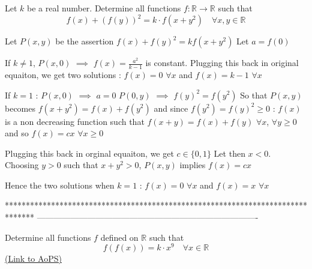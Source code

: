 \begin{solution}
	\begin{tcolorbox}Let $k$ be a real number. Determine all functions $f:\mathbb R\to\mathbb R$ such that 
\[f(x)+(f(y))^2=k\cdot f(x+y^2) \quad \forall x,y\in\mathbb R\]\end{tcolorbox}
Let $P(x,y)$ be the assertion $f(x)+f(y)^2=kf(x+y^2)$
Let $a=f(0)$

If $k\ne 1$, $P(x,0)$ $\implies$ $f(x)=\frac{a^2}{k-1}$ is constant. Plugging this back in original equaiton, we get two solutions :
$\boxed{f(x)=0}$ $\forall x$ and $\boxed{f(x)=k-1}$ $\forall x$

If $k=1$ :
$P(x,0)$ $\implies$ $a=0$
$P(0,y)$ $\implies$ $f(y)^2=f(y^2)$ So that $P(x,y)$ becomes $f(x+y^2)=f(x)+f(y^2)$ and since $f(y^2)=f(y)^2\ge 0$ :
$f(x)$ is a non decreasing function such that $f(x+y)=f(x)+f(y)$ $\forall x$, $\forall y\ge 0$ and so $f(x)=cx$ $\forall x\ge 0$

Plugging this back in orginal equaiton, we get $c\in\{0,1\}$
Let then $x<0$. Choosing $y>0$ such that $x+y^2>0$, $P(x,y)$ implies $f(x)=cx$

Hence the two solutions when $k=1$ :
$\boxed{f(x)=0}$ $\forall x$ and $\boxed{f(x)=x}$ $\forall x$
\end{solution}
*******************************************************************************
-------------------------------------------------------------------------------

\begin{problem}
	Determine all functions $f$ defined on $\mathbb R$  such that \[ f (f (x)) = k \cdot  x ^ {9} \quad \forall x\in\mathbb R\]
	\flushright \href{https://artofproblemsolving.com/community/c6h565934}{(Link to AoPS)}
\end{problem}



